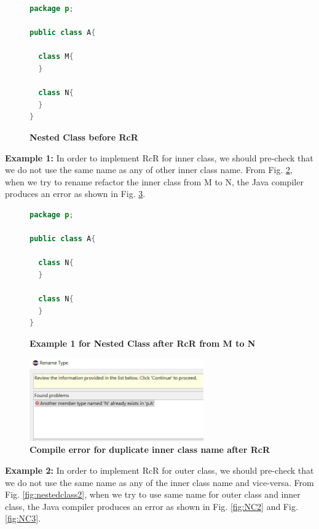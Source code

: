 \begin{figure}[th]
\centering
\begin{minipage}[t]{0.5\linewidth}
\begin{lstlisting}[language=java, basicstyle=\scriptsize\ttfamily,frame=single]
package p;

public class A{	

  class M{
  }

  class N{
  }
} 
\end{lstlisting}
\end{minipage}
\caption{\textbf{Nested Class before RcR}}
\label{fig:original}
\end{figure}

\textbf{Example 1:} In order to implement RcR for inner class, we should pre-check that we do not use the same name as any of other inner class name. From Fig. \ref{fig:nestedclass1}, when we try to rename refactor the inner class from M to N, the Java compiler produces an error as shown in Fig. \ref{fig:NC1}.

\begin{figure}[th]
\centering
\begin{minipage}[t]{0.5\linewidth}
\begin{lstlisting}[language=java, basicstyle=\scriptsize\ttfamily,frame=single]
package p;

public class A{	
    
  class N{
  }
    
  class N{
  }
} 
\end{lstlisting}
\end{minipage}
\caption{\textbf{Example 1 for Nested Class after RcR from M to N}}
\label{fig:nestedclass1}
\end{figure}

\begin{figure}[H]
\centerline{\includegraphics[width=75mm,scale=0.4]{NC1.jpg}}
\caption{\textbf{Compile error for duplicate inner class name after RcR}}
\label{fig:NC1}
\end{figure}

\textbf{Example 2:} In order to implement RcR for outer class, we should pre-check that we do not use the same name as any of the inner class name and vice-versa. From Fig. \ref{fig:nestedclass2}, when we try to use same name for outer class and inner class, the Java compiler produces an error as shown in Fig. \ref{fig:NC2} and Fig. \ref{fig:NC3}.

